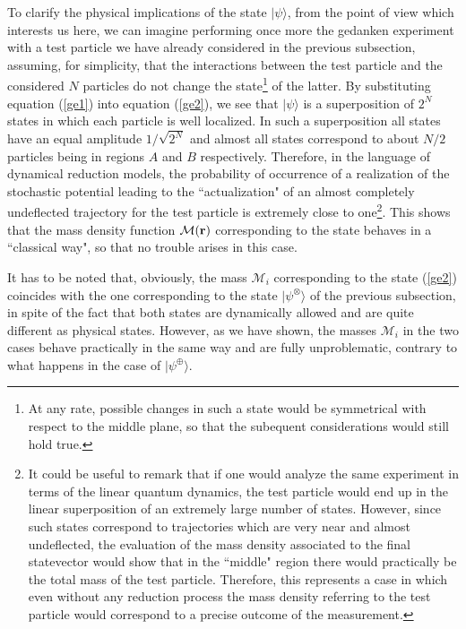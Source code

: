 \documentclass[12pt]{article}
\begin{document}
To clarify the physical implications of the state $|\psi\rangle$,
from the point of view which interests us here, we can imagine
performing once more the gedanken experiment with a test particle
we have already considered in the previous subsection, assuming,
for simplicity, that the interactions between the test particle
and the considered $N$ particles do not change the
state\footnote{At any rate, possible changes in such a state would
be symmetrical with respect to the middle plane, so that the
subequent considerations would still hold true.} of the latter. By
substituting equation (\ref{ge1}) into equation (\ref{ge2}), we
see that $|\psi\rangle$ is a superposition of $2^{N}$ states in
which each particle is well localized. In such a superposition all
states have an equal amplitude $1/\sqrt{2^{N}}$  and almost all
states correspond to about $N/2$ particles being in regions $A$
and $B$ respectively. Therefore, in the language of dynamical
reduction models, the probability of occurrence of a realization
of the stochastic potential leading to the ``actualization" of an
almost completely undeflected trajectory for the test particle is
extremely close to one\footnote{It could be useful to remark that
if one would analyze the same experiment in terms of the  linear
quantum dynamics, the test particle would end up in the linear
superposition of an extremely large number of states. However,
since such states correspond to trajectories which are very near
and almost undeflected, the evaluation of the mass density
associated to  the final statevector would show that in the
``middle" region there would practically be  the total mass of the
test particle. Therefore, this represents a case in which even
without any reduction process the mass density referring to the
test particle would correspond to a precise outcome of the
measurement.}. This shows that the mass density function
${\mathcal M}({\bf r})$ corresponding to the state behaves in a
``classical way", so that no trouble arises in this case.

It has to be noted that, obviously, the mass ${\mathcal M}_{i}$
corresponding to the state (\ref{ge2}) coincides with the one
corresponding to the state $|\psi^{\otimes}\rangle$ of the
previous subsection, in spite of the fact that both states are
dynamically allowed and are quite different as physical states.
However, as we have shown, the masses ${\mathcal M}_{i}$ in the
two cases behave practically in the same way and are fully
unproblematic, contrary to what happens in the case of
$|\psi^{\oplus}\rangle$.
\end{document}
